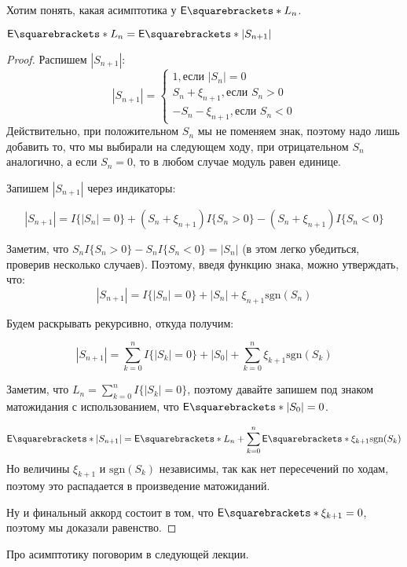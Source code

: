 Хотим понять, какая асимптотика у $\E{L_n}$.

\begin{lemma}
  $\E{L_n} = \E{|S_{n + 1}|}$
\end{lemma}

\begin{proof}
  Распишем $|S_{n+1}|$:
  \[
  |S_{n + 1}| =
  \begin{cases}
    1, \text{если $|S_n| = 0$}\\
    S_n + \xi_{n + 1}, \text{если $S_n > 0$}\\
    -S_n - \xi_{n + 1}, \text{если $S_n < 0$}
  \end{cases}
  \]
  Действительно, при положительном $S_n$ мы не поменяем знак, поэтому
  надо лишь добавить то, что мы выбирали на следующем ходу, при отрицательном
  $S_n$ аналогично, а если $S_n = 0$, то в любом случае модуль равен единице.

  Запишем $|S_{n + 1}|$ через индикаторы:

  \[
    |S_{n + 1}| = I\{|S_n| = 0\} + (S_n + \xi_{n + 1})I\{S_n > 0\} -(S_n + \xi_{n + 1})I\{S_n < 0\}
  \]

  Заметим, что $S_n I\{S_n > 0\} - S_n I\{S_n < 0\} = |S_n|$ (в этом легко
  убедиться, проверив несколько случаев). Поэтому, введя функцию знака, можно
  утверждать, что:
  \[
   |S_{n + 1}| = I\{|S_n| = 0\} + |S_n| + \xi_{n + 1}\mathrm{sgn}(S_n)
  \]

  Будем раскрывать рекурсивно, откуда получим:

  \[
    |S_{n + 1}| = \sum\limits_{k = 0}^{n} I\{|S_k| = 0\} + |S_0| +
    \sum\limits_{k = 0}^{n} \xi_{k + 1}\mathrm{sgn}(S_{k})
  \]

  Заметим, что $L_n = \sum\limits_{k = 0}^{n} I\{|S_k| = 0\}$, поэтому давайте
  запишем под знаком матожидания с использованием, что $\E{|S_0|} = 0$.

  \[
    \E{|S_{n + 1}|} = \E{L_n} + \sum\limits_{k = 0}^{n} \E{\xi_{k + 1}\mathrm{sgn}(S_{k})}
  \]
  Но величины $\xi_{k + 1}$ и $\mathrm{sgn}(S_{k})$ независимы, так как нет
  пересечений по ходам, поэтому это распадается в произведение матожиданий.

  Ну и финальный аккорд состоит в том, что $\E{\xi_{k + 1}} = 0$, поэтому
  мы доказали равенство.
\end{proof}

Про асимптотику поговорим в следующей лекции.
